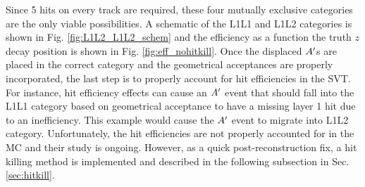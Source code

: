 Since 5 hits on every track are required, these four mutually exclusive categories are the only viable possibilities. A schematic of the L1L1 and L1L2 categories is shown in Fig. \ref{fig:L1L2_L1L2_schem} and the efficiency as a function the truth $z$ decay position is shown in Fig. \ref{fig:eff_nohitkill}. %
Once the displaced $A^\prime$s are placed in the correct category and the geometrical acceptances are properly incorporated, the last step is to properly account for hit efficiencies in the SVT. For instance, hit efficiency effects can cause an $A^\prime$ event that should fall into the L1L1 category based on geometrical acceptance to have a missing layer 1 hit due to an inefficiency. This example would cause the $A^\prime$ event to migrate into L1L2 category. Unfortunately, the hit efficiencies are not properly accounted for in the MC and their study is ongoing. However, as a quick post-reconstruction fix, a hit killing method is implemented and described in the following subsection in Sec. \ref{sec:hitkill}. %


